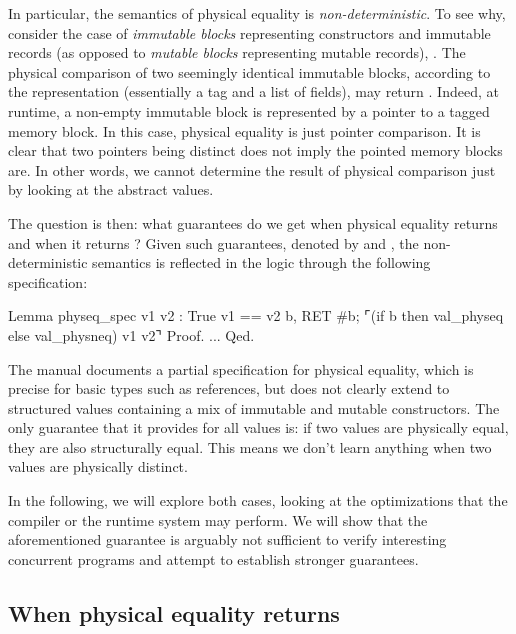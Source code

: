 In particular, the semantics of physical equality is \emph{non-deterministic}.
To see why, consider the case of \emph{immutable blocks} representing constructors and immutable records (as opposed to \emph{mutable blocks} representing mutable records), \eg {}.
The physical comparison of two seemingly identical immutable blocks, according to the \Rocq representation (essentially a tag and a list of fields), may return .
Indeed, at runtime, a non-empty immutable block is represented by a pointer to a tagged memory block.
In this case, physical equality is just pointer comparison.
It is clear that two pointers being distinct does not imply the pointed memory blocks are.
In other words, we cannot determine the result of physical comparison just by looking at the abstract values.

The question is then: what guarantees do we get when physical equality returns  and when it returns ?
Given such guarantees, denoted by  and , the non-deterministic semantics is reflected in the logic through the following specification:

\begin{coqcode}
Lemma physeq_spec v1 v2 :
  {{{ True }}}
    v1 == v2
  {{{ b, RET #b; ⌜(if b then val_physeq else val_physneq) v1 v2⌝ }}}
Proof. ... Qed.
\end{coqcode}

The \OCaml manual documents a partial specification for physical equality, which is precise for basic types such as references, but does not clearly extend to structured values containing a mix of immutable and mutable constructors.
The only guarantee that it provides for all values is: if two values are physically equal, they are also structurally equal.
This means we don't learn anything when two values are physically distinct.

In the following, we will explore both cases, looking at the optimizations that the compiler or the runtime system may perform.
We will show that the aforementioned guarantee is arguably not sufficient to verify interesting concurrent programs and attempt to establish stronger guarantees.

\subsection{When physical equality returns }

